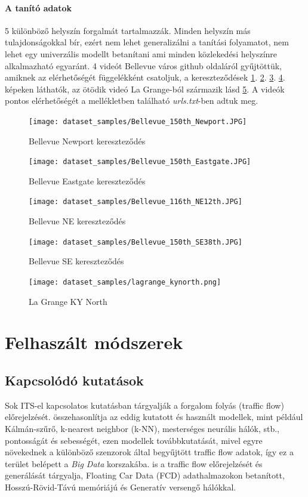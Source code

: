 \documentclass[12pt,a4paper]{article}
\begin{document}
\paragraph{A tanító adatok} 5 különböző helyszín forgalmát tartalmazzák. Minden helyszín más tulajdonságokkal bír, ezért nem lehet generalizálni
a tanítási folyamatot, nem lehet egy univerzális modellt betanítani ami minden közlekedési helyszínre alkalmazható egyaránt.
4 videót Bellevue város github oldaláról gyűjtöttük, amiknek az elérhetőségét függelékként csatoljuk, a kereszteződések
\ref{fig: BellevueNewport}. \ref{fig: BellevueEastgate}. \ref{fig: BellevueNE}. \ref{fig: BellevueSE}. képeken láthatók, az ötödik videó La Grange-ból származik lásd \ref{lagrangekynorth}. A videók pontos elérhetőségét
a mellékletben található \emph{urls.txt}-ben adtuk meg.
\begin{figure}
    \texttt{[image: dataset\_samples/Bellevue\_150th\_Newport.JPG]}
    \caption{Bellevue Newport kereszteződés}
    \label{fig: BellevueNewport}
\end{figure}
\begin{figure}
    \texttt{[image: dataset\_samples/Bellevue\_150th\_Eastgate.JPG]}
    \caption{Bellevue Eastgate kereszteződés}
    \label{fig: BellevueEastgate}
\end{figure}
\begin{figure}
    \texttt{[image: dataset\_samples/Bellevue\_116th\_NE12th.JPG]}
    \caption{Bellevue NE kereszteződés}
    \label{fig: BellevueNE}
\end{figure}
\begin{figure}
    \texttt{[image: dataset\_samples/Bellevue\_150th\_SE38th.JPG]}
    \caption{Bellevue SE kereszteződés}
    \label{fig: BellevueSE}
\end{figure}
\begin{figure}
    \texttt{[image: dataset\_samples/lagrange\_kynorth.png]}
    \caption{La Grange KY North}
    \label{lagrangekynorth}
\end{figure}

\newpage
\section{Felhaszált módszerek}
\subsection{Kapcsolódó kutatások} 
Sok ITS-el kapcsolatos kutatásban tárgyalják a forgalom folyás (traffic flow) előrejelzését. \cite{PAUL2017177} összehasonlítja az eddig
kutatott és használt modellek, mint például Kálmán-szűrő, k-nearest neighbor (k-NN), mesterséges neurális hálók, stb., pontosságát és
sebességét, ezen modellek továbbkutatását, mivel egyre növekednek a különböző szenzorok által  begyűjtött traffic flow adatok, így ez a terület belépett
a \emph{Big Data} korszakába. \cite{10.1371/journal.pone.0253868} is a traffic flow előrejelzését és generálását tárgyalja, Floating Car Data (FCD)
adathalmazokon betanított, Hosszú-Rövid-Távú memóriájú és Generatív versengő hálókkal.
\end{document}
